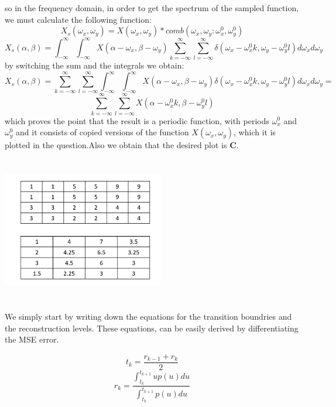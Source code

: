 \documentclass[12pt]{article}
\begin{document}
so in the frequency domain, in order to get the spectrum of the sampled function, we must calculate the following function:
$$X_s(\omega_x, \omega_y) = X(\omega_x, \omega_y) * comb(\omega_x, \omega_y:   \omega^{0}_x, \omega^{0}_y)$$
$$X_s(\alpha, \beta) = \int^{\infty}_{-\infty}\int^{\infty}_{-\infty}X(\alpha - \omega_x, \beta - \omega_y)\sum^{\infty}_{k = -\infty}\sum^{\infty}_{l = -\infty}\delta(\omega_x - \omega^{0}_x k, \omega_y - \omega^{0}_y l)d\omega_xd\omega_y$$
by switching the sum and the integrals we obtain:
$$X_s(\alpha, \beta) = \sum^{\infty}_{k = -\infty}\sum^{\infty}_{l = -\infty}\int^{\infty}_{-\infty}\int^{\infty}_{-\infty}X(\alpha - \omega_x, \beta - \omega_y)\delta(\omega_x - \omega^{0}_x k, \omega_y - \omega^{0}_y l) d\omega_xd\omega_y = $$
$$ \sum^{\infty}_{k = -\infty}\sum^{\infty}_{l = -\infty} X(\alpha - \omega^{0}_x k, \beta - \omega^{0}_y l)$$
which proves the point that the result is a periodic function, with periods  $\omega^{0}_x$ and $\omega^{0}_y$ and it consists of copied versions of the function $X(\omega_x, \omega_y)$, which it is plotted in the question.Also we obtain that the desired plot is \textbf{C}.

\section{}
\begin{center}
	  \includegraphics[width=200pt]{fig2.jpg}
	\label{fig_1}
	\end{center}

\section{}

We simply start by writing down the equations for the transition boundries and the reconstruction levels. These equations, can be easily derived by differentiating the MSE error.

$$t_{k} = \frac{r_{k-1} + r_k}{2}$$
$$r_k = \frac{\int_{t_k}^{t_{k + 1}} up(u)du}{\int_{t_k}^{t_{k + 1}}p(u)du}$$
\end{document}
